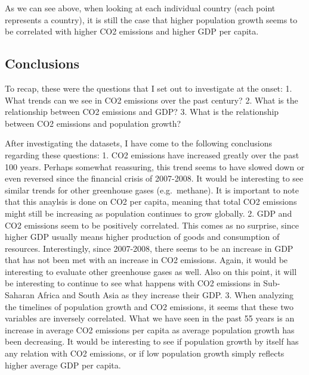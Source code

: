 \documentclass[11pt]{article}
\begin{document}
    As we can see above, when looking at each individual country (each point
represents a country), it is still the case that higher population
growth seems to be correlated with higher CO2 emissions and higher GDP
per capita.

    \hypertarget{conclusions}{%
\subsection{Conclusions}\label{conclusions}}

    To recap, these were the questions that I set out to investigate at the
onset: 1. What trends can we see in CO2 emissions over the past century?
2. What is the relationship between CO2 emissions and GDP? 3. What is
the relationship between CO2 emissions and population growth?

    After investigating the datasets, I have come to the following
conclusions regarding these questions: 1. CO2 emissions have increased
greatly over the past 100 years. Perhaps somewhat reassuring, this trend
seems to have slowed down or even reversed since the financial crisis of
2007-2008. It would be interesting to see similar trends for other
greenhouse gases (e.g.~methane). It is important to note that this
anaylsis is done on CO2 per capita, meaning that total CO2 emissions
might still be increasing as population continues to grow globally. 2.
GDP and CO2 emissions seem to be positively correlated. This comes as no
surprise, since higher GDP usually means higher production of goods and
consumption of resources. Interestingly, since 2007-2008, there seems to
be an increase in GDP that has not been met with an increase in CO2
emissions. Again, it would be interesting to evaluate other greenhouse
gases as well. Also on this point, it will be interesting to continue to
see what happens with CO2 emissions in Sub-Saharan Africa and South Asia
as they increase their GDP. 3. When analyzing the timelines of
population growth and CO2 emissions, it seems that these two variables
are inversely correlated. What we have seen in the past 55 years is an
increase in average CO2 emissions per capita as average population
growth has been decreasing. It would be interesting to see if population
growth by itself has any relation with CO2 emissions, or if low
population growth simply reflects higher average GDP per capita.


    
    
    
    
\end{document}
